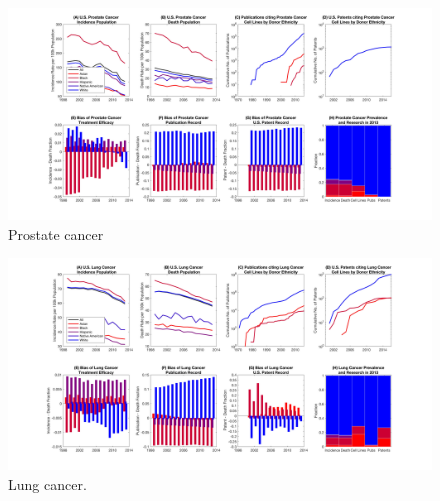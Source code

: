 \documentclass[10pt]{article}
\begin{document}
\begin{figure}[h!]
\centering
\includegraphics[width=1\columnwidth, trim = {30cm 10cm 30cm 5cm}, clip]{Figures/ProstateComposite.jpg}
\caption{\label{PS2} Prostate cancer}
\end{figure}

\begin{figure}[h!]
\centering
\includegraphics[width=1\columnwidth, trim = {30cm 10cm 30cm 5cm}, clip]{Figures/LungComposite.jpg}
\caption{\label{PS2}  Lung cancer.}
\end{figure}
\end{document}
